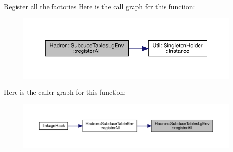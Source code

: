 Register all the factories Here is the call graph for this function\+:\nopagebreak
\begin{figure}[H]
\begin{center}
\leavevmode
\includegraphics[width=350pt]{d7/df2/namespaceHadron_1_1SubduceTablesLgEnv_abb63f9dacfb5b881f3052ce08000b859_cgraph}
\end{center}
\end{figure}
Here is the caller graph for this function\+:\nopagebreak
\begin{figure}[H]
\begin{center}
\leavevmode
\includegraphics[width=350pt]{d7/df2/namespaceHadron_1_1SubduceTablesLgEnv_abb63f9dacfb5b881f3052ce08000b859_icgraph}
\end{center}
\end{figure}
